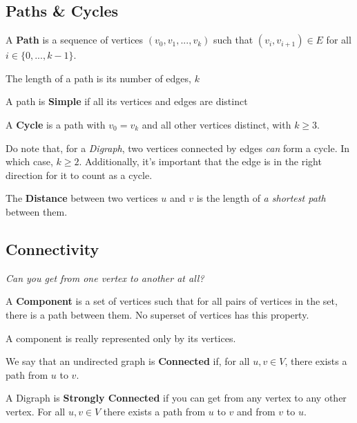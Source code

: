\documentclass[12pt]{article}
\begin{document}
  \subsection{Paths \& Cycles}

   {
    A {\bf Path} is a sequence of vertices $(v_0, v_1, ..., v_k)$ such that $(v_i,
    v_{i + 1}) \in E$ for all $i \in \{0, ..., k - 1\}$.

    The length of a path is its number of edges, $k$
  }

   {
    A path is {\bf Simple} if all its vertices and edges are distinct
  }

   {
    A {\bf Cycle} is a path with $v_0 = v_k$ and all other vertices distinct, with
    $k \ge 3$.

    Do note that, for a {\it Digraph}, two vertices connected by edges {\it can}
    form a cycle. In which case, $k \ge 2$. Additionally, it's important that the
    edge is in the right direction for it to count as a cycle.
  }

   {
    The {\bf Distance} between two vertices $u$ and $v$ is the length of {\it a
    shortest path} between them.
  }

  \subsection{Connectivity}

  {\it Can you get from one vertex to another at all?}

   {
    A {\bf Component} is a set of vertices such that for all pairs of vertices in
    the set, there is a path between them. No superset of vertices has this
    property.


    A component is really represented only by its vertices.
  }

   {
    We say that an undirected graph is {\bf Connected} if, for all $u, v \in V$,
    there exists a path from $u$ to $v$.

  }

   {
    A Digraph is {\bf Strongly Connected} if you can get from any vertex to any
    other vertex. For all $u, v \in V$ there exists a path from $u$ to $v$ and
    from $v$ to $u$.

  }
\end{document}
